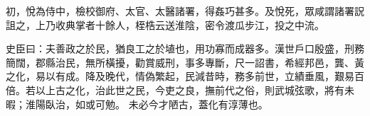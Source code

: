 \begin{pinyinscope}
 初，悅為侍中，檢校御府、太官、太醫諸署，得姦巧甚多。及悅死，眾咸謂諸署詋
 詛之，上乃收典掌者十餘人，桎梏云送淮陰，密令渡瓜步江，投之中流。



 史臣曰：夫善政之於民，猶良工之於埴也，用功寡而成器多。漢世戶口殷盛，刑務簡闊，郡縣治民，無所橫擾，勸賞威刑，事多專斷，尺一詔書，希經邦邑，龔、黃之化，易以有成。降及晚代，情偽繁起，民減昔時，務多前世，立績垂風，艱易百倍。若以上古之化，治此世之民，今吏之良，撫前代之俗，則武城弦歌，將有未暇；淮陽臥治，如或可勉。
 未必今才陋古，蓋化有淳薄也。



\end{pinyinscope}